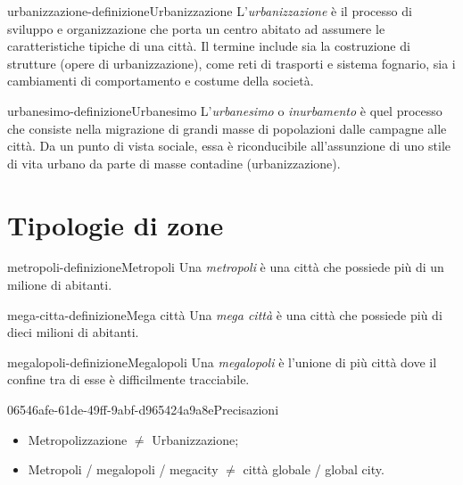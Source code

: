 \documentclass[preview]{standalone}
\begin{document}
\begin{snippetdefinition}{urbanizzazione-definizione}{Urbanizzazione}
    L'\textit{urbanizzazione} è il processo di sviluppo e organizzazione
    che porta un centro abitato ad assumere le caratteristiche tipiche di una città.
    Il termine include sia la costruzione di strutture (opere di urbanizzazione),
    come reti di trasporti e sistema fognario, sia i cambiamenti di comportamento e
    costume della società. 
\end{snippetdefinition}

\begin{snippetdefinition}{urbanesimo-definizione}{Urbanesimo}
    L'\textit{urbanesimo} o \textit{inurbamento} è quel processo che consiste nella migrazione
    di grandi masse di popolazioni dalle campagne alle città.
    Da un punto di vista sociale, essa è riconducibile all'assunzione di uno stile
    di vita urbano da parte di masse contadine (urbanizzazione). 
\end{snippetdefinition}


\section{Tipologie di zone}

\begin{snippetdefinition}{metropoli-definizione}{Metropoli}
    Una \textit{metropoli} è una città che possiede più di un milione di abitanti.
\end{snippetdefinition}

\begin{snippetdefinition}{mega-citta-definizione}{Mega città}
    Una \textit{mega città} è una città che possiede più di dieci milioni di abitanti.
\end{snippetdefinition}

\begin{snippetdefinition}{megalopoli-definizione}{Megalopoli}
    Una \textit{megalopoli} è l'unione di più città dove il confine
    tra di esse è difficilmente tracciabile.
\end{snippetdefinition}


\begin{snippetnote}{06546afe-61de-49ff-9abf-d965424a9a8e}{Precisazioni}
    \begin{itemize}
        \item Metropolizzazione \(\neq\) Urbanizzazione;
        \item Metropoli / megalopoli / megacity \(\neq\) città globale / global
        city.
    \end{itemize}
\end{snippetnote}
\end{document}
